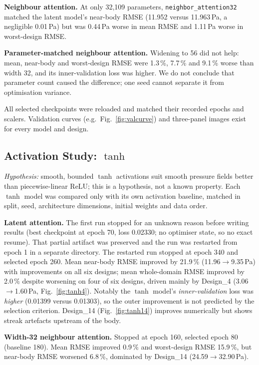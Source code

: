 \documentclass[journal]{IEEEtran}
\newcommand{\hyp}[1]{\textit{Hypothesis:} #1}
\begin{document}
\textbf{Neighbour attention.} At only 32{,}109 parameters,
\texttt{neighbor\_attention32} matched the latent model's near-body RMSE
(11.952 versus 11.963\,Pa, a negligible 0.01\,Pa) but was 0.44\,Pa worse in mean
RMSE and 1.11\,Pa worse in worst-design RMSE.

\textbf{Parameter-matched neighbour attention.} Widening to 56 did not help:
mean, near-body and worst-design RMSE were 1.3\,\%, 7.7\,\% and 9.1\,\% worse than
width 32, and its inner-validation loss was higher. We do not conclude that
parameter count caused the difference; one seed cannot separate it from
optimisation variance.

All selected checkpoints were reloaded and matched their recorded epochs and
scalers. Validation curves (e.g.\ Fig.~\ref{fig:valcurve}) and three-panel
images exist for every model and design.

\subsection{Activation Study: $\tanh$}
\label{sec:exp_tanh}
\hyp{smooth, bounded $\tanh$ activations suit smooth pressure fields better than
piecewise-linear ReLU; this is a hypothesis, not a known property.}
Each $\tanh$ model was compared only with its own activation baseline, matched in
split, seed, architecture dimensions, initial weights and data order.

\textbf{Latent attention.} The first run stopped for an unknown reason
before writing results (best checkpoint at epoch 70, loss 0.02330; no optimiser
state, so no exact resume). That partial artifact was preserved and the run was
restarted from epoch 1 in a separate directory. The restarted run stopped at
epoch 340 and selected epoch 260. Mean near-body RMSE improved by 21.9\,\%
(11.96$\rightarrow$9.35\,Pa) with improvements on all six designs; mean
whole-domain RMSE improved by 2.0\,\% despite worsening on four of six designs,
driven mainly by Design\_4 (3.06$\rightarrow$1.60\,Pa,
Fig.~\ref{fig:tanh4}). Notably the $\tanh$ model's \emph{inner-validation} loss
was \emph{higher} (0.01399 versus 0.01303), so the outer improvement is not
predicted by the selection criterion. Design\_14 (Fig.~\ref{fig:tanh14})
improves numerically but shows streak artefacts upstream of the body.

\textbf{Width-32 neighbour attention.} Stopped at epoch 160, selected epoch 80
(baseline 180). Mean RMSE improved 0.9\,\% and worst-design RMSE 15.9\,\%, but
near-body RMSE worsened 6.8\,\%, dominated by Design\_14
(24.59$\rightarrow$32.90\,Pa).
\end{document}
